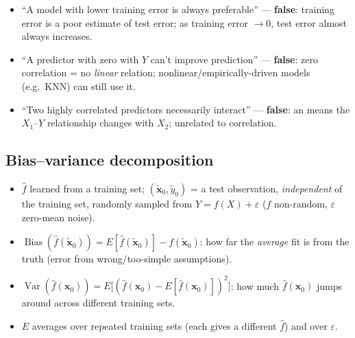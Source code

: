 \begin{trap}
\begin{itemize}
\item ``A model with lower training error is always preferable'' --- \textbf{false}: training error is a poor estimate of test error; as training error $\to0$, test error almost always increases.
\item ``A predictor with zero  with $Y$ can't improve prediction'' --- \textbf{false}: zero correlation = no \emph{linear} relation; nonlinear/empirically-driven models (e.g.\ KNN) can still use it.
\item ``Two highly correlated predictors necessarily interact'' --- \textbf{false}: an  means the $X_1$--$Y$ relationship changes with $X_2$; unrelated to correlation.
\end{itemize}
\end{trap}

\subsection{Bias--variance decomposition}

\begin{keybox}
\begin{itemize}
\item $\hat f$ learned from a training set; $(\tilde{\mathbf x}_0,\tilde y_0)$ = a test observation, \emph{independent} of the training set, randomly sampled from $Y=f(X)+\varepsilon$ ($f$ non-random, $\varepsilon$ zero-mean noise).
\item {}$\operatorname{Bias}(\hat f(\tilde{\mathbf x}_0))=E[\hat f(\tilde{\mathbf x}_0)]-f(\tilde{\mathbf x}_0)$: how far the \emph{average} fit is from the truth (error from wrong/too-simple assumptions).
\item {}$\operatorname{Var}(\hat f(\mathbf x_0))=E\big[(\hat f(\mathbf x_0)-E[\hat f(\mathbf x_0)])^2\big]$: how much $\hat f(\mathbf x_0)$ jumps around across different training sets.
\item $E$ averages over repeated training sets (each gives a different $\hat f$) and over $\varepsilon$.
\end{itemize}
\end{keybox}


